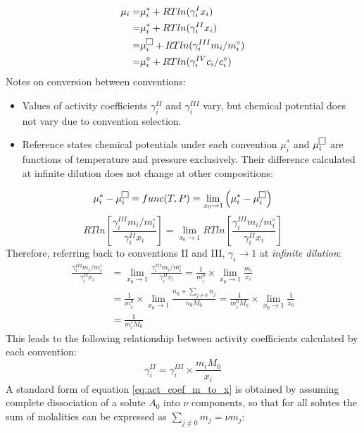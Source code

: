 \documentclass[onecolumn]{article}
\begin{document}
\begin{equation}
\begin{aligned}
\mu_i = & \mu_i^{*} + RTln(\gamma_i^{I} x_i) \\
	= 	& \mu_i^{*} + RTln(\gamma_i^{II} x_i) \\
	=	& \mu_i^{\fbox{}} + RTln(\gamma_i^{III} m_i/m_i^{\circ}) \\
	= 	& \mu_i^{\diamond} + RTln(\gamma_i^{IV} c_i/c_i^{\circ})
\end{aligned}
\end{equation}
Notes on conversion between conventions: 
\begin{itemize}
\item Values of activity coefficients $\gamma_i^{II}$ and $\gamma_i^{III}$ vary, but chemical potential does not vary due to convention selection.
\item Reference states chemical potentials under each convention $\mu_i^{*}$ and $\mu_i^{\fbox{}}$  are functions of temperature and pressure exclusively. Their difference calculated at infinite dilution does not change at other compositions:
\end{itemize}
\[
\mu_i^{*} - \mu_i^{\fbox{}}  =  func(T,P) =  \lim_{x_0 \to 1} \left( \mu_i^{*} - \mu_i^{\fbox{}}\right) 
\]
\[
RTln\left[ \frac{\gamma_i^{III} m_i/m_i^{\circ}}{\gamma_i^{II} x_i}\right] = \lim_{x_0 \to 1} RTln\left[ \frac{\gamma_i^{III} m_i/m_i^{\circ}}{\gamma_i^{II} x_i}\right] 
\]
Therefore, referring back to conventions II and III, $\gamma_i \rightarrow 1$ at \textit{infinite dilution}:
\[
\begin{aligned}
\frac{\gamma_i^{III} m_i/m_i^{\circ}}{\gamma_i^{II} x_i} & = \lim_{x_0 \to 1} \frac{\gamma_i^{III} m_i/m_i^{\circ}}{\gamma_i^{II} x_i} = \frac{1}{m_i^0} \times \lim_{x_0 \to 1} \frac{m_i}{x_i} \\
& = \frac{1}{m_i^0} \times \lim_{x_0 \to 1} \frac{n_0+\sum_{j \neq 0}n_j}{n_0 M_0} = \frac{1}{m_i^0 M_0} \times \lim_{x_0 \to 1} \frac{1}{x_0} \\
& = \frac{1}{m_i^\circ M_0}
\end{aligned}
\]
This leads to the following relationship between activity coefficients calculated by each convention:
\begin{equation}
\label{eq:act_coef_m_to_x}
\gamma_i^{II} = \gamma_i^{III} \times \frac{m_i M_0}{x_i}
\end{equation}
A standard form of equation \ref{eq:act_coef_m_to_x} is obtained by assuming complete dissociation of a solute $A_0$ into $\nu$ components, so that for all solutes the sum of molalities can be expressed as $\sum_{j \neq 0}m_j = \nu m_j $:
\end{document}
